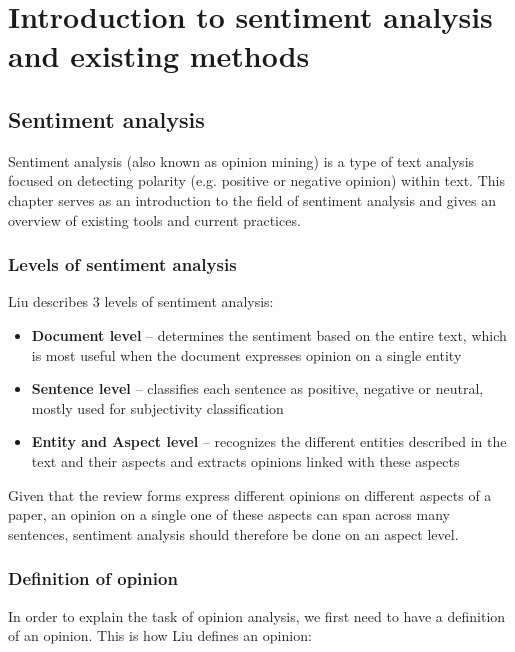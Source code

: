 
\chapter{Introduction to sentiment analysis and existing methods}

\section{Sentiment analysis}
Sentiment analysis (also known as opinion mining) is a type of text analysis focused on detecting polarity (e.g. positive or negative opinion) within text. This chapter serves as an introduction to the field of sentiment analysis and gives an overview of existing tools and current practices.
\subsection{Levels of sentiment analysis}
Liu \cite{liu_2015} describes 3 levels of sentiment analysis:
\begin{itemize}
    \item \textbf{Document level} -- determines the sentiment based on the entire text, which is most useful when the document expresses opinion on a single entity
    \item \textbf{Sentence level} -- classifies each sentence as positive, negative or neutral, mostly used for subjectivity classification  
    \item \textbf{Entity and Aspect level} -- recognizes the different entities described in the text and their aspects and extracts opinions linked with these aspects
    \end{itemize}
Given that the review forms express different opinions on different aspects of a paper, an opinion on a single one of these aspects can span across many sentences, sentiment analysis should therefore be done on an aspect level.
\subsection{Definition of opinion}
In order to explain the task of opinion analysis, we first need to have a definition of an opinion. This is how Liu \cite{liu_2015} defines an opinion:

